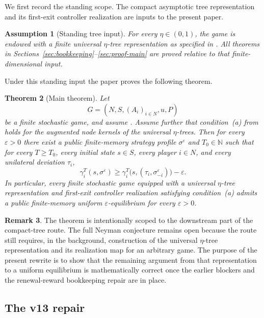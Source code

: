 \documentclass[12pt]{article}
\newtheorem{theorem}{Theorem}[section]
\newtheorem{assumption}[theorem]{Assumption}
\theoremstyle{definition}
\newtheorem{remark}[theorem]{Remark}
\newcommand{\eps}{\varepsilon}
\newcommand{\N}{\mathbb{N}}
\newcommand{\1}{\mathbf{1}}
\begin{document}
We first record the standing scope. The compact asymptotic tree representation and
its first-exit controller realization are inputs to the present paper.

\begin{assumption}[Standing tree input]
\label{ass:tree-input}
For every $\eta\in(0,1)$, the game is endowed with a finite universal
$\eta$-tree representation as specified in
. All theorems in
Sections~\ref{sec:bookkeeping}--\ref{sec:proof-main} are proved relative to that
finite-dimensional input.
\end{assumption}

Under this standing input the paper proves the following theorem.

\begin{theorem}[Main theorem]
\label{thm:main}
Let
\[
G=(N,S,(A_i)_{i\in N},u,P)
\]
be a finite stochastic game, and assume . Assume further
that condition~\textnormal{(a)} from  holds for the augmented node
kernels of the universal $\eta$-trees. Then for every $\eps>0$ there exist a
public finite-memory strategy profile $\sigma^\eps$ and $T_0\in\N$ such that for
every $T\ge T_0$, every initial state $s\in S$, every player $i\in N$, and every
unilateral deviation $\tau_i$,
\[
\gamma_i^T(s,\sigma^\eps)
\ge
\gamma_i^T\bigl(s,(\tau_i,\sigma^\eps_{-i})\bigr)-\eps.
\]
In particular, every finite stochastic game equipped with a universal
$\eta$-tree representation and first-exit controller realization satisfying
condition~\textnormal{(a)} admits a public finite-memory uniform
$\eps$-equilibrium for every $\eps>0$.
\end{theorem}

\begin{remark}
The theorem is intentionally scoped to the downstream part of the compact-tree
route. The full Neyman conjecture remains open because the route still requires,
in the background, construction of the universal $\eta$-tree representation and
its realization map for an arbitrary game. The purpose of the present rewrite is
to show that the remaining argument from that representation to a uniform
equilibrium is mathematically correct once the earlier blockers and the
renewal-reward bookkeeping repair are in place.
\end{remark}


\subsection{The v13 repair}
\end{document}
